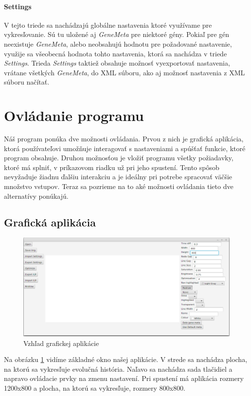 \paragraph{Settings} V tejto triede sa nachádzajú globálne nastavenia ktoré využívame
pre vykresľovanie. Sú tu uložené aj \emph{GeneMeta} pre niektoré gény.
Pokiaľ pre gén neexistuje \emph{GeneMeta}, alebo neobsahujú hodnotu pre požadované nastavenie, 
využije sa všeobecná hodnota tohto nastavenia, ktorá sa nachádza v triede \emph{Settings}.
Trieda \emph{Settings} taktiež obsahuje možnosť vyexportovať nastavenia, vrátane všetkých 
\emph{GeneMeta}, do XML súboru, ako aj možnosť nastavenia z XML súboru načítať.

\section{Ovládanie programu}
Náš program ponúka dve možnosti ovládania. Prvou z nich je grafická aplikácia, ktorá používateľovi 
umožňuje interagovať s nastaveniami a 
spúšťať funkcie, ktoré program obsahuje.
Druhou možnosťou je vložiť programu všetky požiadavky, ktoré má splniť, v príkazovom riadku
už pri jeho spustení. Tento spôsob nevyžaduje žiadnu ďalšiu interakciu a je ideálny pri potrebe
spracovať väčšie množstvo vstupov.
Teraz sa pozrieme na to aké možnosti ovládania tieto dve alternatívy ponúkajú.
\subsection{Grafická aplikácia}
\begin{figure}[t]
 \centering
\includegraphics[width=1\textwidth]{images/gui}
\caption{Vzhľad grafickej aplikácie}\label{obr:gui}
\end{figure}

Na obrázku \ref{obr:gui} vidíme základné okno našej aplikácie. V strede sa nachádza plocha, na ktorú sa 
vykresľuje evolučná história. Naľavo sa nachádza sada tlačidiel a napravo ovládacie prvky na zmenu nastavení.
Pri spustení má aplikácia rozmery 1200x800 a plocha, na ktorú sa vykresľuje, rozmery 800x800.
